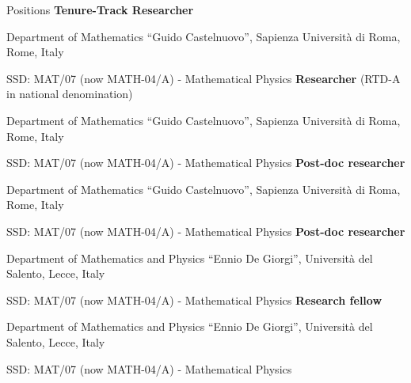 \begin{rubric}{Positions}
  \textbf{Tenure-Track Researcher}\par Department of Mathematics ``Guido Castelnuovo'', Sapienza Università di Roma, Rome, Italy\par SSD: MAT/07 (now MATH-04/A) - Mathematical Physics
  \textbf{Researcher} (RTD-A in national denomination)\par Department of Mathematics ``Guido Castelnuovo'', Sapienza Università di Roma, Rome, Italy\par SSD: MAT/07 (now MATH-04/A) - Mathematical Physics
  \textbf{Post-doc researcher}\par Department of Mathematics ``Guido Castelnuovo'', Sapienza Università di Roma, Rome, Italy\par SSD: MAT/07 (now MATH-04/A) - Mathematical Physics
  \textbf{Post-doc researcher}\par Department of Mathematics and Physics ``Ennio De Giorgi'', Università del Salento, Lecce, Italy\par SSD: MAT/07 (now MATH-04/A) - Mathematical Physics
  \textbf{Research fellow}\par Department of Mathematics and Physics ``Ennio De Giorgi'', Università del Salento, Lecce, Italy\par SSD: MAT/07 (now MATH-04/A) - Mathematical Physics
\end{rubric}
